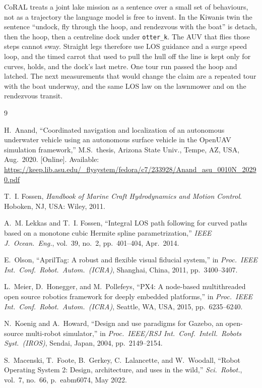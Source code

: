 \documentclass[conference]{IEEEtran}
\def\CoRAL{CoRAL}
\def\otterk{\texttt{otter\_k}}
\begin{document}
\CoRAL{} treats a joint lake mission as a sentence over a small set of behaviours, not as a trajectory the language model is free to invent. In the Kiwanis twin the sentence ``undock, fly through the hoop, and rendezvous with the boat'' is detach, then the hoop, then a centreline dock under \otterk{}. The AUV that flies those steps cannot sway. Straight legs therefore use LOS guidance and a surge speed loop, and the timed carrot that used to pull the hull off the line is kept only for curves, holds, and the dock's last metre. One tour run passed the hoop and latched. The next measurements that would change the claim are a repeated tour with the boat underway, and the same LOS law on the lawnmower and on the rendezvous transit.

\balance
\begin{thebibliography}{9}

H.~Anand, ``Coordinated navigation and localization of an autonomous underwater vehicle using an autonomous surface vehicle in the {OpenUAV} simulation framework,'' M.S.\ thesis, Arizona State Univ., Tempe, AZ, USA, Aug.\ 2020. [Online]. Available: \url{https://keep.lib.asu.edu/_flysystem/fedora/c7/233928/Anand_asu_0010N_20290.pdf}

T.~I. Fossen, \emph{Handbook of Marine Craft Hydrodynamics and Motion Control}. Hoboken, NJ, USA: Wiley, 2011.

A.~M. Lekkas and T.~I. Fossen, ``Integral {LOS} path following for curved paths based on a monotone cubic {Hermite} spline parametrization,'' \emph{IEEE J.\ Ocean.\ Eng.}, vol.~39, no.~2, pp.~401--404, Apr.\ 2014.

E.~Olson, ``{AprilTag}: A robust and flexible visual fiducial system,'' in \emph{Proc.\ IEEE Int.\ Conf.\ Robot.\ Autom.\ (ICRA)}, Shanghai, China, 2011, pp.~3400--3407.

L.~Meier, D.~Honegger, and M.~Pollefeys, ``{PX4}: A node-based multithreaded open source robotics framework for deeply embedded platforms,'' in \emph{Proc.\ IEEE Int.\ Conf.\ Robot.\ Autom.\ (ICRA)}, Seattle, WA, USA, 2015, pp.~6235--6240.

N.~Koenig and A.~Howard, ``Design and use paradigms for {Gazebo}, an open-source multi-robot simulator,'' in \emph{Proc.\ IEEE/RSJ Int.\ Conf.\ Intell.\ Robots Syst.\ (IROS)}, Sendai, Japan, 2004, pp.~2149--2154.

S.~Macenski, T.~Foote, B.~Gerkey, C.~Lalancette, and W.~Woodall, ``Robot {Operating System 2}: Design, architecture, and uses in the wild,'' \emph{Sci.\ Robot.}, vol.~7, no.~66, p.~eabm6074, May 2022.

\end{thebibliography}
\end{document}
